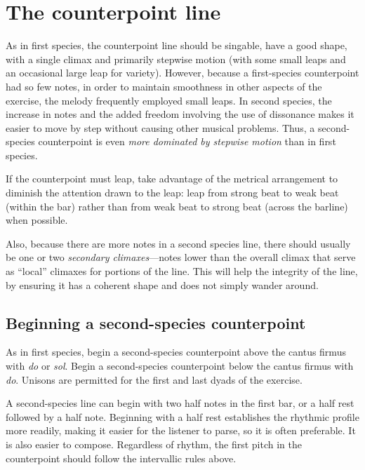 \documentclass{book}
\begin{document}
\hypertarget{the-counterpoint-line-1}{%
\section{The counterpoint line}\label{the-counterpoint-line-1}}

As in first species, the counterpoint line should be singable, have a good
shape, with a single climax and primarily stepwise motion (with some small
leaps and an occasional large leap for variety). However, because a
first-species counterpoint had so few notes, in order to maintain smoothness
in other aspects of the exercise, the melody frequently employed small leaps.
In second species, the increase in notes and the added freedom involving the
use of dissonance makes it easier to move by step without causing other
musical problems. Thus, a second-species counterpoint is even \emph{more
dominated by stepwise motion} than in first species.

If the counterpoint must leap, take advantage of the metrical arrangement to
diminish the attention drawn to the leap: leap from strong beat to weak beat
(within the bar) rather than from weak beat to strong beat (across the
barline) when possible.

Also, because there are more notes in a second species line, there should
usually be one or two \emph{secondary climaxes}---notes lower than the overall
climax that serve as ``local'' climaxes for portions of the line. This will
help the integrity of the line, by ensuring it has a coherent shape and does
not simply wander around.

\hypertarget{beginning-a-second-species-counterpoint}{%
\subsection{Beginning a second-species
counterpoint}\label{beginning-a-second-species-counterpoint}}

As in first species, begin a second-species counterpoint above the cantus
firmus with \emph{do} or \emph{sol}. Begin a second-species counterpoint below
the cantus firmus with \emph{do}. Unisons are permitted for the first and last
dyads of the exercise.

A second-species line can begin with two half notes in the first bar, or a
half rest followed by a half note. Beginning with a half rest establishes the
rhythmic profile more readily, making it easier for the listener to parse, so
it is often preferable. It is also easier to compose. Regardless of rhythm,
the first pitch in the counterpoint should follow the intervallic rules above.
\end{document}
